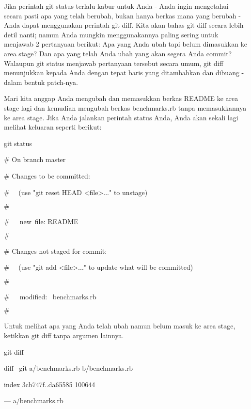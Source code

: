 Jika perintah git status terlalu kabur untuk Anda - Anda ingin mengetahui secara pasti apa yang telah berubah, bukan hanya berkas mana yang berubah - Anda dapat menggunakan perintah git diff. Kita akan bahas git diff secara lebih detil nanti; namun Anda mungkin menggunakannya paling sering untuk menjawab 2 pertanyaan berikut: Apa yang Anda ubah tapi belum dimasukkan ke area stage? Dan apa yang telah Anda ubah yang akan segera Anda commit? Walaupun git status menjawab pertanyaan tersebut secara umum, git diff menunjukkan kepada Anda dengan tepat baris yang ditambahkan dan dibuang - dalam bentuk patch-nya. \par
\noindent 
Mari kita anggap Anda mengubah dan memasukkan berkas README ke area stage lagi dan kemudian mengubah berkas benchmarks.rb tanpa memasukkannya ke area stage. Jika Anda jalankan perintah status Anda, Anda akan sekali lagi melihat keluaran seperti berikut: \par
\vspace{12pt}
\noindent 
git status \par
\noindent 
 $  \#  $ On branch master \par
\noindent 
 $  \#  $ Changes to be committed: \par
\noindent 
 $  \#  $~~ (use "git reset HEAD <file>..." to unstage) \par
\noindent 
 $  \#  $ \par
\noindent 
 $  \#  $~~~new~file:   README \par
\noindent 
 $  \#  $ \par
\noindent 
 $  \#  $ Changes not staged for commit: \par
\noindent 
 $  \#  $~~ (use "git add <file>..." to update what will be committed) \par
\noindent 
 $  \#  $ \par
\noindent 
 $  \#  $~~~modified:~  benchmarks.rb \par
\noindent 
 $  \#  $ \par
\noindent 
Untuk melihat apa yang Anda telah ubah namun belum masuk ke area stage, ketikkan git diff tanpa argumen lainnya. \par
\vspace{12pt}
\noindent 
git diff \par
\noindent 
diff --git a/benchmarks.rb b/benchmarks.rb \par
\noindent 
index 3cb747f..da65585 100644 \par
\noindent 
--- a/benchmarks.rb \par
\noindent 

